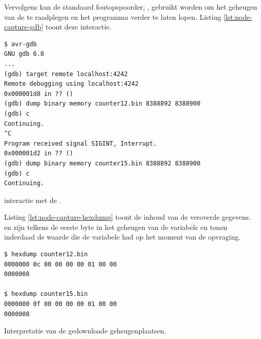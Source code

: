 Vervolgens kan de standaard foutopspoorder, , gebruikt worden om het
geheugen van de \mcu te raadplegen en het programma verder te laten lopen.
Listing \ref{lst:node-capture-gdb} toont deze interactie.

\begin{listing}
  \begin{verbatim}
$ avr-gdb
GNU gdb 6.8
...
(gdb) target remote localhost:4242
Remote debugging using localhost:4242
0x000001d8 in ?? ()
(gdb) dump binary memory counter12.bin 8388892 8388900
(gdb) c
Continuing.
^C
Program received signal SIGINT, Interrupt.
0x000001d2 in ?? ()
(gdb) dump binary memory counter15.bin 8388892 8388900
(gdb) c
Continuing.
  \end{verbatim}
  \caption{ interactie met de \mcu.}
  \label{lst:node-capture-gdb}
\end{listing}

Listing \ref{lst:node-capture-hexdump} toont de inhoud van de veroverde
gegevens.  en  zijn telkens de eerste byte in het geheugen van
de  variabele en tonen inderdaad de waarde die de variabele had op
het moment van de opvraging.

\begin{listing}
  \begin{verbatim}
$ hexdump counter12.bin 
0000000 0c 00 00 00 00 01 00 00                        
0000008

$ hexdump counter15.bin 
0000000 0f 00 00 00 00 01 00 00                        
0000008
  \end{verbatim}
  \caption{Interpretatie van de gedownloade geheugenplaatsen.}
  \label{lst:node-capture-hexdump}
\end{listing}

